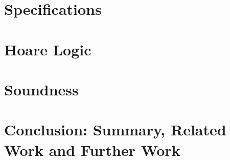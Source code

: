 \documentclass[acmsmall]{acmart}
\begin{document}
\section{ Specifications}
\label{sect:spec}    



\section{Hoare Logic} %
\label{sect:proofSystem}
 
 
 
 \section{Soundness} %
 \label{sect:sound:proofSystem}


%

  \section{Conclusion: Summary, Related Work and Further Work}
 \label{sect:related}
\label{sect:conclusion}
 



%
% 
%
% 

%
%
\end{document}
